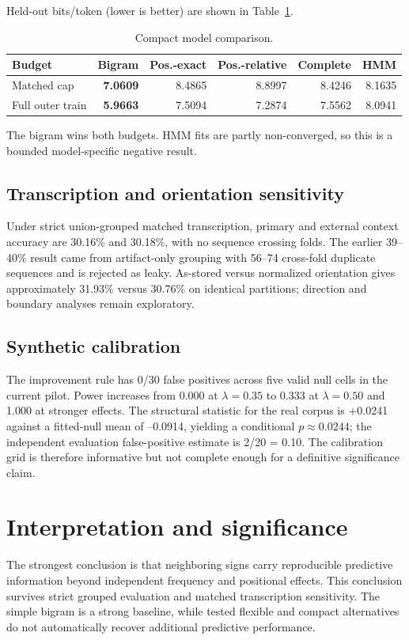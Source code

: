 \documentclass[11pt]{article}
\begin{document}
Held-out bits/token (lower is better) are shown in Table~\ref{tab:compact}.
\begin{table}[h]
\centering
\caption{Compact model comparison.}
\label{tab:compact}
\begin{tabular}{lrrrrr}
\toprule
Budget & Bigram & Pos.-exact & Pos.-relative & Complete & HMM\\
\midrule
Matched cap & \textbf{7.0609} & 8.4865 & 8.8997 & 8.4246 & 8.1635\\
Full outer train & \textbf{5.9663} & 7.5094 & 7.2874 & 7.5562 & 8.0941\\
\bottomrule
\end{tabular}
\end{table}
The bigram wins both budgets. HMM fits are partly non-converged, so this is a bounded model-specific negative result.

\subsection{Transcription and orientation sensitivity}
Under strict union-grouped matched transcription, primary and external context accuracy are 30.16\% and 30.18\%, with no sequence crossing folds. The earlier 39--40\% result came from artifact-only grouping with 56--74 cross-fold duplicate sequences and is rejected as leaky. As-stored versus normalized orientation gives approximately 31.93\% versus 30.76\% on identical partitions; direction and boundary analyses remain exploratory.

\subsection{Synthetic calibration}
The improvement rule has 0/30 false positives across five valid null cells in the current pilot. Power increases from 0.000 at $\lambda=0.35$ to 0.333 at $\lambda=0.50$ and 1.000 at stronger effects. The structural statistic for the real corpus is +0.0241 against a fitted-null mean of --0.0914, yielding a conditional $p\approx0.0244$; the independent evaluation false-positive estimate is 2/20 = 0.10. The calibration grid is therefore informative but not complete enough for a definitive significance claim.

\section{Interpretation and significance}
The strongest conclusion is that neighboring signs carry reproducible predictive information beyond independent frequency and positional effects. This conclusion survives strict grouped evaluation and matched transcription sensitivity. The simple bigram is a strong baseline, while tested flexible and compact alternatives do not automatically recover additional predictive performance.
\end{document}
